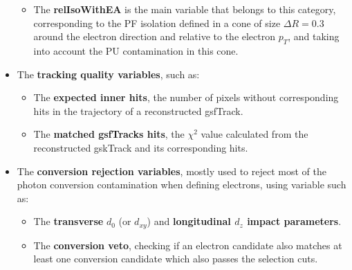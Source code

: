 \documentclass[a4paper, 10pt, openright]{report}
\begin{document}
\begin{itemize}
\begin{itemize}
\item The \textbf{relIsoWithEA} is the main variable that belongs to this category, corresponding to the \ac{PF} isolation defined in a cone of size $\Delta R = 0.3$ around the electron direction and relative to the electron $p_T$, and taking into account the \ac{PU} contamination in this cone.
\end{itemize}
\item The \textbf{tracking quality variables}, such as:
\begin{itemize}
\item The \textbf{expected inner hits}, the number of pixels without corresponding hits in the trajectory of a reconstructed gsfTrack.
\item The \textbf{matched gsfTracks hits}, the $\chi^2$ value calculated from the reconstructed gskTrack and its corresponding hits.
\end{itemize}%
\item The \textbf{conversion rejection variables}, mostly used to reject most of the photon conversion contamination when defining electrons, using variable such as:
\begin{itemize}
\item The \textbf{transverse} $d_0$ (or $d_{xy}$) and \textbf{longitudinal $d_z$ impact parameters}.
\item The \textbf{conversion veto}, checking if an electron candidate also matches at least one conversion candidate which also passes the selection cuts.
\end{itemize}
\end{itemize}

\end{document}
